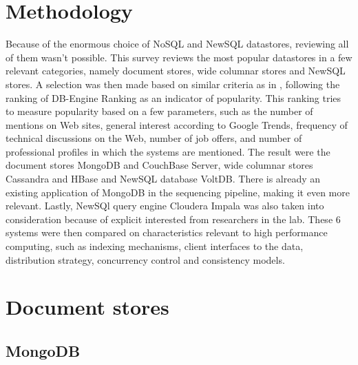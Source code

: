 \documentclass{article}
\begin{document}
\section{Methodology}

Because of the enormous choice of NoSQL and NewSQL datastores, reviewing all of them wasn't possible. This survey reviews the most popular datastores in a few relevant categories, namely document stores, wide columnar stores and NewSQL stores. A selection was then made based on similar criteria as in \cite{grolinger2013data}, following the ranking of DB-Engine Ranking \cite{db_engine_rank} as an indicator of popularity. This ranking tries to measure popularity based on a few parameters, such as the number of mentions on Web sites, general interest according to Google Trends, frequency of technical discussions on the Web, number of job offers, and number of professional profiles in which the systems are mentioned. The result were the document stores MongoDB and CouchBase Server, wide columnar stores Cassandra and HBase and NewSQL database VoltDB. There is already an existing application of MongoDB in the sequencing pipeline, making it even more relevant. Lastly, NewSQl query engine Cloudera Impala was also taken into consideration because of explicit interested from researchers in the lab.
These 6 systems were then compared on characteristics relevant to high performance computing, such as indexing mechanisms, client interfaces to the data, distribution strategy, concurrency control and consistency models.

\section{Document stores}

\subsection{MongoDB}
\end{document}

